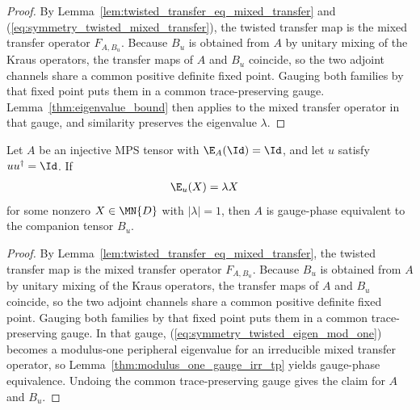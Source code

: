 \begin{proof}
    \leanok
    By Lemma~\ref{lem:twisted_transfer_eq_mixed_transfer} and
    (\ref{eq:symmetry_twisted_mixed_transfer}), the twisted transfer
    map is the mixed transfer operator $F_{A,B_u}$.
    Because $B_u$ is obtained from $A$ by unitary mixing of the Kraus operators,
    the transfer maps of $A$ and $B_u$ coincide, so the two adjoint channels
    share a common positive definite fixed point.
    Gauging both families by that fixed point puts them in a common
    trace-preserving gauge.
    Lemma~\ref{thm:eigenvalue_bound} then applies to the mixed transfer
    operator in that gauge, and similarity preserves the eigenvalue $\lambda$.
\end{proof}

\begin{lemma}%
    \label{thm:twisted_transfer_modulus_one_gauge_phase}
    \leanok
    Let $A$ be an injective MPS tensor with $\E_A(\Id)=\Id$, and let $u$
    satisfy $u u^\dagger = \Id$.
    If
    \begin{align}
        \E_u(X) & = \lambda X
        \label{eq:symmetry_twisted_eigen_mod_one}
    \end{align}
    for some nonzero $X \in \MN{D}$ with $|\lambda|=1$, then $A$ is
    gauge-phase equivalent to the companion tensor $B_u$.
\end{lemma}

\begin{proof}
    \leanok
    By Lemma~\ref{lem:twisted_transfer_eq_mixed_transfer}, the twisted transfer
    map is the mixed transfer operator $F_{A,B_u}$.
    Because $B_u$ is obtained from $A$ by unitary mixing of the Kraus operators,
    the transfer maps of $A$ and $B_u$ coincide, so the two adjoint channels
    share a common positive definite fixed point.
    Gauging both families by that fixed point puts them in a common
    trace-preserving gauge.
    In that gauge, (\ref{eq:symmetry_twisted_eigen_mod_one}) becomes a
    modulus-one peripheral eigenvalue for an irreducible mixed transfer
    operator, so Lemma~\ref{thm:modulus_one_gauge_irr_tp} yields
    gauge-phase equivalence.
    Undoing the common trace-preserving gauge gives the claim for $A$ and $B_u$.
\end{proof}

